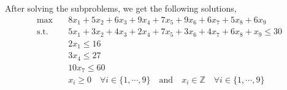 \documentclass[11pt]{article}
\begin{document}
\noindent After solving the subproblems, we get the following solutions,\\

\begin{align}
\text{max} & \quad 8 x_1+5 x_2+6 x_3+9 x_4+7 x_5+9 x_6+6 x_7+5 x_8  + 6 x_9 \nonumber \\ 
\text{s.t.} & \quad 5 x_1+ 3 x_2+4 x_3+2 x_4+7 x_5+3 x_6+4 x_7+6 x_8 + x_9 \leq 30 \nonumber \\
&\quad 2 x_1 \leq 16\nonumber\\ 
& \quad  3 x_4 \leq 27 \nonumber\\
& \quad  10 x_7 \leq 60 \nonumber\\
& \quad x_i \geq 0 \quad \forall i \in \{1, \cdots,9\} \quad \text{and} \quad x_i \in \mathbb{Z} \quad \forall i \in \{1, \cdots,9\} \nonumber
\end{align} \nonumber
\end{document}
